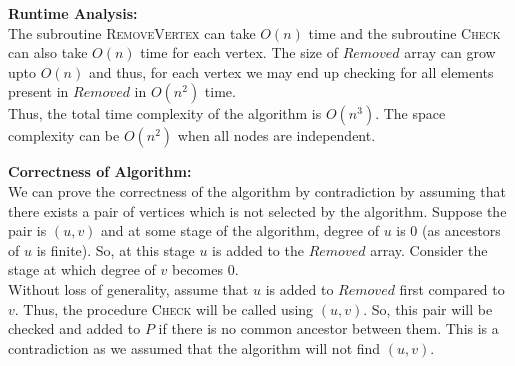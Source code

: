 \documentclass[a4paper]{article}
\begin{document}
\begin{enumerate}[1.]
    \textbf{Runtime Analysis:}\\
    The subroutine \textsc{RemoveVertex} can take $O(n)$ time and the subroutine \textsc{Check} can also take $O(n)$ time for each vertex. The size of $Removed$ array can grow upto $O(n)$ and thus, for each vertex we may end up checking for all elements present in $Removed$ in $O(n^2)$ time.\\
    Thus, the total time complexity of the algorithm is $O(n^3)$. The space complexity can be $O(n^2)$ when all nodes are independent. 
    
    \textbf{Correctness of Algorithm:}\\
    We can prove the correctness of the algorithm by contradiction by assuming that there exists a pair of vertices which is not selected by the algorithm.
    Suppose the pair is $(u,v)$ and at some stage of the algorithm, degree of $u$ is 0 (as ancestors of $u$ is finite). So, at this stage $u$ is added to the $Removed$ array. Consider the stage at which degree of $v$ becomes 0.\\ Without loss of generality, assume that $u$ is added to $Removed$ first compared to $v$. Thus, the procedure \textsc{Check} will be called using $(u,v)$. So, this pair will be checked and added to $P$ if there is no common ancestor between them. This is a contradiction as we assumed that the algorithm will not find $(u,v)$. 
    
    {\hfill\qedsymbol}
    
    
\end{enumerate}
\newpage
\end{document}
